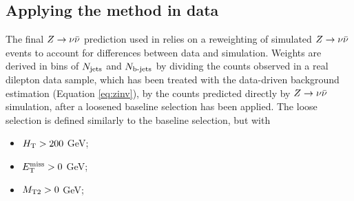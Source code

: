 \FloatBarrier
\subsection{Applying the method in data}
The final $Z\rightarrow \nu\bar{\nu}$ prediction used in \cite{CMS:2016nhb} relies on a reweighting of simulated $Z\rightarrow \nu\bar{\nu}$ events to account for differences between data and simulation. Weights are derived in bins of $N_{\rm jets}$ and $N_{\text{b-jets}}$ by dividing the counts observed in a real dilepton data sample, which has been treated with the data-driven background estimation (Equation \ref{eq:zinv}), by the counts predicted directly by $Z\rightarrow \nu\bar{\nu}$ simulation, after a loosened baseline selection has been applied. The loose selection is defined similarly to the baseline selection, but with
\begin{itemize}
\item $H_{\rm T}>200$ GeV;
\item $E_{\text{T}}^{\rm miss}>0$ GeV;
\item $M_{\text{T}2}>0$ GeV;
\end{itemize}

